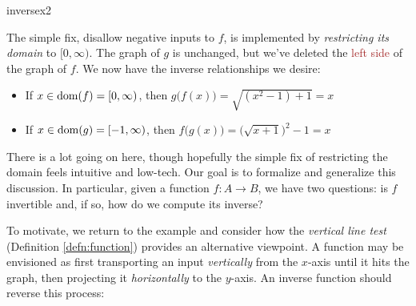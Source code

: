 \begin{example}{}{inversex2}
\begin{minipage}[t]{0.29\linewidth}
\end{minipage}\medbreak
The simple fix, disallow negative inputs to $f$, is implemented by \emph{restricting its domain} to $[0,\infty)$. The graph of $g$ is unchanged, but we've deleted the \textcolor{Brown}{left side} of the graph of $f$. We now have the inverse relationships we desire:
\begin{itemize}\itemsep0pt
  \item If $x\in\operatorname{dom}(f)=[0,\infty)$, then $g\bigl(f(x)\bigr)=\sqrt{(x^2-1)+1}=x$
  \item If $x\in\operatorname{dom}(g)=[-1,\infty)$, then $f\bigl(g(x)\bigr)=\bigl(\sqrt{x+1}\bigr)^2-1=x$
\end{itemize}
\end{example}




There is a lot going on here, though hopefully the simple fix of restricting the domain feels intuitive and low-tech. Our goal is to formalize and generalize this discussion. In particular, given a function $f:A\to B$, we have two questions: is $f$ invertible and, if so, how do we compute its inverse?

\goodbreak



To motivate, we return to the example and consider how the \emph{vertical line test} (Definition \ref{defn:function}) provides an alternative viewpoint. A function may be envisioned as first transporting an input \emph{vertically} from the $x$-axis until it hits the graph, then projecting it \emph{horizontally} to the $y$-axis. An inverse function should reverse this process:\par

